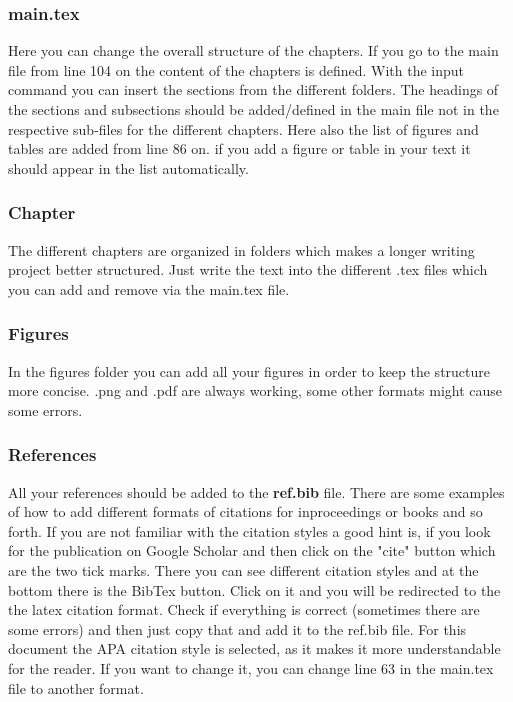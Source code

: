\subsubsection{main.tex}
Here you can change the overall structure of the chapters. If you go to the main file from line 104 on the content of the chapters is defined. With the input command you can insert the sections from the different folders. The headings of the sections and subsections should be added/defined in the main file not in the respective sub-files for the different chapters. Here also the list of figures and tables are added from line 86 on. if you add a figure or table in your text it should appear in the list automatically. 

\subsubsection{Chapter}
The different chapters are organized in folders which makes a longer writing project better structured. Just write the text into the different .tex files which you can add and remove via the main.tex file. 

\subsubsection{Figures}
In the figures folder you can add all your figures in order to keep the structure more concise. .png and .pdf are always working, some other formats might cause some errors. 

\subsubsection{References}
All your references should be added to the \textbf{ref.bib} file. There are some examples of how to add different formats of citations for inproceedings or books and so forth. If you are not familiar with the citation styles a good hint is, if you look for the publication on Google Scholar and then click on the "cite" button which are the two tick marks. There you can see different citation styles and at the bottom there is the BibTex button. Click on it and you will be redirected to the the latex citation format. Check if everything is correct (sometimes there are some errors) and then just copy that and add it to the ref.bib file. For this document the APA citation style is selected, as it makes it more understandable for the reader. If you want to change it, you can change line 63 in the main.tex file to another format.

